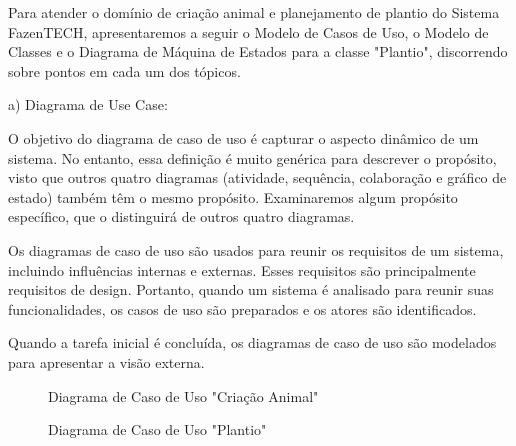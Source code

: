 Para atender o domínio de criação animal e planejamento de plantio do Sistema FazenTECH, apresentaremos a seguir o Modelo de Casos de Uso, o Modelo de Classes e o Diagrama de Máquina de Estados para a classe "Plantio", discorrendo sobre pontos em cada um dos tópicos.

a) Diagrama de Use Case:

O objetivo do diagrama de caso de uso é capturar o aspecto dinâmico de um sistema. No entanto, essa definição é muito genérica para descrever o propósito, visto que outros quatro diagramas (atividade, sequência, colaboração e gráfico de estado) também têm o mesmo propósito. Examinaremos algum propósito específico, que o distinguirá de outros quatro diagramas.

Os diagramas de caso de uso são usados para reunir os requisitos de um sistema, incluindo influências internas e externas. Esses requisitos são principalmente requisitos de design. Portanto, quando um sistema é analisado para reunir suas funcionalidades, os casos de uso são preparados e os atores são identificados.

Quando a tarefa inicial é concluída, os diagramas de caso de uso são modelados para apresentar a visão externa.

\begin{figure}[!htb]
    \centering
    \begin{minipage}{\wd0}
        \caption{Diagrama de Caso de Uso "Criação Animal"}
        \label{fig:figura1}
    \end{minipage}
\end{figure}

\begin{figure}[!htb]
    \centering
    \begin{minipage}{\wd0}
        \caption{Diagrama de Caso de Uso "Plantio"}
        \label{fig:figura2}
    \end{minipage}
\end{figure}

